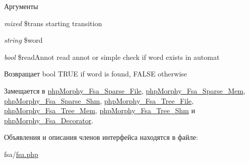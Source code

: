 \begin{DoxyParams}{Аргументы}
\item[{\em mixed}]\$trans starting transition \item[{\em string}]\$word \item[{\em bool}]\$readAnnot read annot or simple check if word exists in automat \end{DoxyParams}
\begin{DoxyReturn}{Возвращает}
bool TRUE if word is found, FALSE otherwise 
\end{DoxyReturn}


Замещается в \hyperlink{classphpMorphy__Fsa__Sparse__File_a4995b3f44bde356009c67df7afed2c5a}{phpMorphy\_\-Fsa\_\-Sparse\_\-File}, \hyperlink{classphpMorphy__Fsa__Sparse__Mem_a21d59e28eaf3ae4061d17d27c7beff71}{phpMorphy\_\-Fsa\_\-Sparse\_\-Mem}, \hyperlink{classphpMorphy__Fsa__Sparse__Shm_a2203c12e49953e0b6b6b888f74e06736}{phpMorphy\_\-Fsa\_\-Sparse\_\-Shm}, \hyperlink{classphpMorphy__Fsa__Tree__File_ab82328d726f4474c070fefb7ee342601}{phpMorphy\_\-Fsa\_\-Tree\_\-File}, \hyperlink{classphpMorphy__Fsa__Tree__Mem_a668d55a99a2f866173811f85a1b278c1}{phpMorphy\_\-Fsa\_\-Tree\_\-Mem}, \hyperlink{classphpMorphy__Fsa__Tree__Shm_abf846ead411f058f082ee84ffc16a154}{phpMorphy\_\-Fsa\_\-Tree\_\-Shm} и \hyperlink{classphpMorphy__Fsa__Decorator_a18393b870712e635c13c9f18780311e9}{phpMorphy\_\-Fsa\_\-Decorator}.



Объявления и описания членов интерфейса находятся в файле:\begin{DoxyCompactItemize}
\item 
fsa/\hyperlink{fsa_8php}{fsa.php}\end{DoxyCompactItemize}
